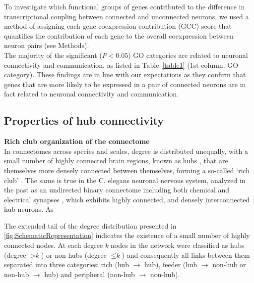 \documentclass[10pt,letterpaper]{article}
\begin{document}
To investigate which functional groups of genes contributed to the difference in transcriptional coupling between connected and unconnected neurons, we used a method of assigning each gene coexpression contribution (GCC) score that quantifies the contribution of each gene to the overall coexpression between neuron pairs (see Methods).  \\



The majority of the significant ($P < 0.05$) GO categories are related to neuronal connectivity and communication, as listed in Table~\ref{table1} (1st column: GO category).
These findings are in line with our expectations as they confirm that genes that are more likely to be expressed in a pair of connected neurons are in fact related to neuronal connectivity and communication.\\


\subsection*{Properties of hub connectivity}
\textbf{Rich club organization of the connectome}\\

In connectomes across species and scales, degree is distributed unequally, with a small number of highly connected brain regions, known as hubs \cite{Sporns:2007ea}, that are themselves more densely connected between themselves, forming a so-called `rich club' \cite{deReus:2013cy, ZamoraLopez:2010hy, Shih:2015cu, vandenHeuvel:2012kh, vandenHeuvel:2011he}.
The same is true in the C. elegans neuronal nervous system, analyzed in the past as an undirected binary connectome including both chemical and electrical synapses \cite{Towlson:2013gf}, which exhibits highly connected, and densely interconnected hub neurons.
As


The extended tail of the degree distribution presented in \ref{fig:SchematicRepresentation} indicates the existence of a small number of highly connected nodes.
At each degree \textit{k} nodes in the network were classified as hubs (degree $>\textit{k}$) or non-hubs (degree $\leq\textit{k}$) and consequently all links between them separated into three categories: rich (hub $\rightarrow$ hub), feeder (hub $\rightarrow$ non-hub or non-hub $\rightarrow$ hub) and peripheral (non-hub $\rightarrow$ non-hub).
\end{document}
